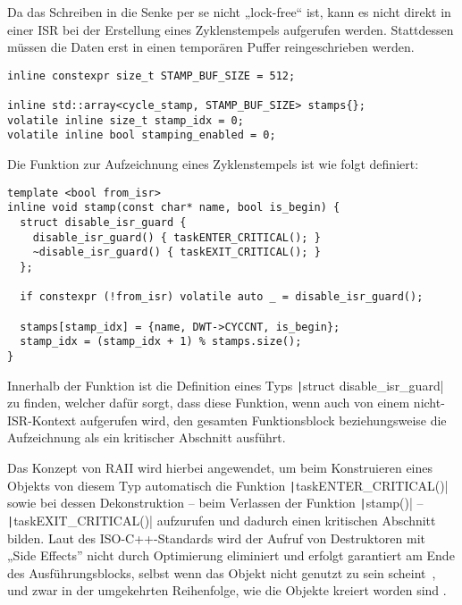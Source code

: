 Da das Schreiben in die Senke per se nicht „lock-free“ ist, kann es nicht direkt
in einer ISR bei der Erstellung eines Zyklenstempels aufgerufen werden.
Stattdessen müssen die Daten erst in einen temporären Puffer reingeschrieben
werden.

\begin{code}
\begin{verbatim}
inline constexpr size_t STAMP_BUF_SIZE = 512;

inline std::array<cycle_stamp, STAMP_BUF_SIZE> stamps{};
volatile inline size_t stamp_idx = 0;
volatile inline bool stamping_enabled = 0;
\end{verbatim}
\end{code}

Die Funktion zur Aufzeichnung eines Zyklenstempels ist wie folgt definiert:

\begin{code}
\begin{verbatim}
template <bool from_isr>
inline void stamp(const char* name, bool is_begin) {
  struct disable_isr_guard {
    disable_isr_guard() { taskENTER_CRITICAL(); }
    ~disable_isr_guard() { taskEXIT_CRITICAL(); }
  };

  if constexpr (!from_isr) volatile auto _ = disable_isr_guard();

  stamps[stamp_idx] = {name, DWT->CYCCNT, is_begin};
  stamp_idx = (stamp_idx + 1) % stamps.size();
}
\end{verbatim}
\end{code}

Innerhalb der Funktion ist die Definition eines Typs \texttt|struct
disable_isr_guard| zu finden, welcher dafür sorgt, dass diese Funktion, wenn
auch von einem nicht-ISR-Kontext aufgerufen wird, den gesamten Funktionsblock
beziehungsweise die Aufzeichnung als ein kritischer Abschnitt ausführt.

Das Konzept von \ac{RAII} wird hierbei angewendet, um beim Konstruieren eines
Objekts von diesem Typ automatisch die Funktion
\texttt|taskENTER_CRITICAL()| sowie bei dessen Dekonstruktion – beim
Verlassen der Funktion \texttt|stamp()| –
\texttt|taskEXIT_CRITICAL()| aufzurufen und dadurch einen kritischen
Abschnitt bilden. Laut des ISO-C++-Standards wird der Aufruf von Destruktoren
mit „Side Effects”\footnotemark{} nicht durch Optimierung eliminiert und erfolgt
garantiert am Ende des Ausführungsblocks, selbst wenn das Objekt nicht genutzt
zu sein scheint~\cite[§6.7.5.4 Abs. 3]{iso_iec_14882_2020}, und zwar in der
umgekehrten Reihenfolge, wie die Objekte kreiert worden sind
\cite{isocpp_dtor_order}.

